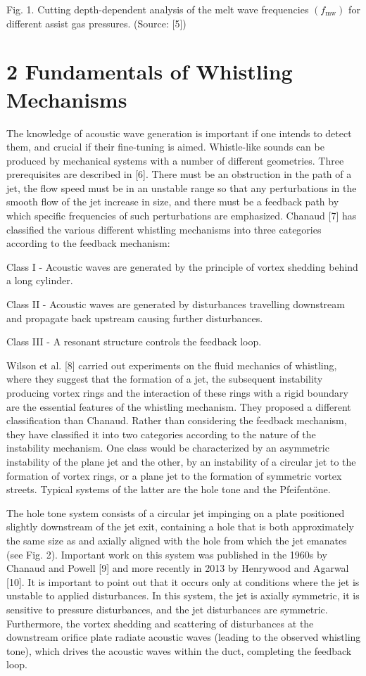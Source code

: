 \documentclass[10pt]{article}
\begin{document}
Fig. 1. Cutting depth-dependent analysis of the melt wave frequencies $\left(f_{\mathrm{mw}}\right)$ for different assist gas pressures. (Source: [5])

\section*{2 Fundamentals of Whistling Mechanisms}
The knowledge of acoustic wave generation is important if one intends to detect them, and crucial if their fine-tuning is aimed. Whistle-like sounds can be produced by mechanical systems with a number of different geometries. Three prerequisites are described in [6]. There must be an obstruction in the path of a jet, the flow speed must be in an unstable range so that any perturbations in the smooth flow of the jet increase in size, and there must be a feedback path by which specific frequencies of such perturbations are emphasized. Chanaud [7] has classified the various different whistling mechanisms into three categories according to the feedback mechanism:

Class I - Acoustic waves are generated by the principle of vortex shedding behind a long cylinder.

Class II - Acoustic waves are generated by disturbances travelling downstream and propagate back upstream causing further disturbances.

Class III - A resonant structure controls the feedback loop.

Wilson et al. [8] carried out experiments on the fluid mechanics of whistling, where they suggest that the formation of a jet, the subsequent instability producing vortex rings and the interaction of these rings with a rigid boundary are the essential features of the whistling mechanism. They proposed a different classification than Chanaud. Rather than considering the feedback mechanism, they have classified it into two categories according to the nature of the instability mechanism. One class would be characterized by an asymmetric instability of the plane jet and the other, by an instability of a circular jet to the formation of vortex rings, or a plane jet to the formation of symmetric vortex streets. Typical systems of the latter are the hole tone and the Pfeifentöne.

The hole tone system consists of a circular jet impinging on a plate positioned slightly downstream of the jet exit, containing a hole that is both approximately the same size as and axially aligned with the hole from which the jet emanates (see Fig. 2). Important work on this system was published in the 1960s by Chanaud and Powell [9] and more recently in 2013 by Henrywood and Agarwal [10]. It is important to point out that it occurs only at conditions where the jet is unstable to applied disturbances. In this system, the jet is axially symmetric, it is sensitive to pressure disturbances, and the jet disturbances are symmetric. Furthermore, the vortex shedding and scattering of disturbances at the downstream orifice plate radiate acoustic waves (leading to the observed whistling tone), which drives the acoustic waves within the duct, completing the feedback loop.
\end{document}
